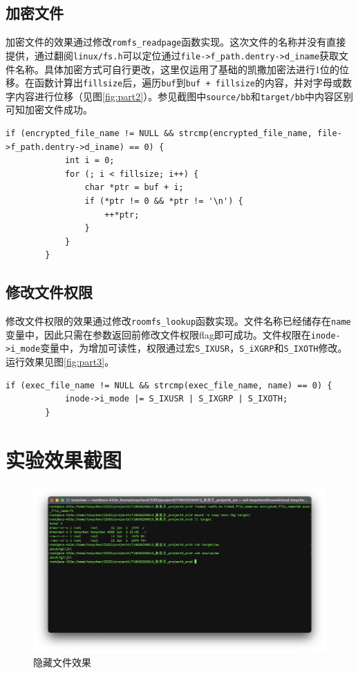 \documentclass[UTF8]{ctexrep}
\begin{document}
    \subsection{加密文件}

    加密文件的效果通过修改\texttt{romfs\_readpage}函数实现。这次文件的名称并没有直接提供，通过翻阅\texttt{linux/fs.h}可以定位通过\texttt{file->f\_path.dentry->d\_iname}获取文件名称。具体加密方式可自行更改，这里仅运用了基础的凯撒加密法进行1位的位移。在函数计算出\texttt{fillsize}后，遍历\texttt{buf}到\texttt{buf + fillsize}的内容，并对字母或数字内容进行位移（见图\ref{fig:part2}）。参见截图中\texttt{source/bb}和\texttt{target/bb}中内容区别可知加密文件成功。

    \begin{lstlisting}[firstnumber=147]
        if (encrypted_file_name != NULL && strcmp(encrypted_file_name, file->f_path.dentry->d_iname) == 0) {
			int i = 0;
			for (; i < fillsize; i++) {
				char *ptr = buf + i;
				if (*ptr != 0 && *ptr != '\n') {
					++*ptr;
				}
			}
		}
    \end{lstlisting}

    \subsection{修改文件权限}

    修改文件权限的效果通过修改\texttt{roomfs\_lookup}函数实现。文件名称已经储存在\texttt{name}变量中，因此只需在参数返回前修改文件权限flag即可成功。文件权限在\texttt{inode->i\_mode}变量中，为增加可读性，权限通过宏\texttt{S\_IXUSR}，\texttt{S\_iXGRP}和\texttt{S\_IXOTH}修改。运行效果见图\ref{fig:part3}。

    \begin{lstlisting}[firstnumber=293]
        if (exec_file_name != NULL && strcmp(exec_file_name, name) == 0) {
            inode->i_mode |= S_IXUSR | S_IXGRP | S_IXOTH;
        }
    \end{lstlisting}

    \section{实验效果截图}

    \begin{figure}[h!]
        \centering
        \includegraphics[width=15cm,keepaspectratio]{images/part1.png}
        \caption{隐藏文件效果}
        \label{fig:part1}
    \end{figure}
\end{document}
